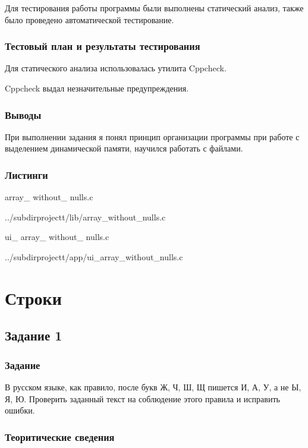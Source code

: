 \documentclass[12pt,a4paper]{report}
\begin{document}
Для тестирования работы программы были выполнены статический анализ, также было проведено автоматической тестирование.
\subsection{Тестовый план и результаты тестирования}

Для статического анализа использовалась утилита Cppcheck.

\vspace{\baselineskip}
Cppcheck выдал незначительные предупреждения.

\subsection{Выводы}

При выполнении задания я понял принцип организации программы при работе с выделением динамической памяти, научился работать с файлами.

\subsection*{Листинги}

array\_ without\_ nulls.c

{../subdirprojectt/lib/array_without_nulls.c}

\vspace{\baselineskip}

ui\_ array\_ without\_ nulls.c


{../subdirprojectt/app/ui_array_without_nulls.c}

\chapter{Строки}
\section{Задание 1}
\subsection{Задание}

В русском языке, как правило, после букв Ж, Ч, Ш, Щ пишется И, А, У, а не Ы, Я, Ю. Проверить заданный текст на соблюдение этого правила и исправить ошибки.


\subsection{Теоритические сведения}
\end{document}

